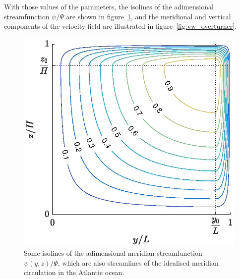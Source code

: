 With those values of the parameters, the isolines of the adimensional streamfunction $\psi/\Psi$ are shown in figure~\ref{fig:psi_overturner}, and the meridional and vertical components of the velocity field are illustrated in figure~\ref{fig:vw_overturner}.
\begin{figure}[ht]
	\centering
	\includegraphics[width=.6\textwidth]{fig/overturner/psi.eps}
	\caption{Some isolines of the adimensional meridian streamfunction $\psi(y,z)/\Psi$, which are also streamlines of the idealised meridian circulation in the Atlantic ocean.}
	\label{fig:psi_overturner}
\end{figure}

